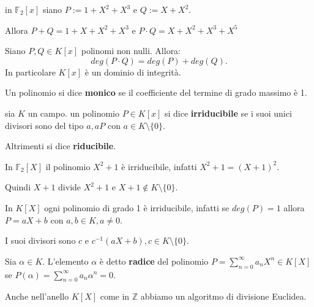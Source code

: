 \documentclass[../main.tex]{subfiles}
\begin{document}
\begin{example}
    in $\mathbb{F}_2[x]$ siano $P := 1 + X^2 + X^3$ e $Q:= X + X^2$.

    Allora $P+Q = 1 + X + X^2 + X^3$ e $P \cdot Q = X + X^2 + X^3 + X^5$
\end{example}

\begin{proposition}
    Siano $P,Q \in K[x]$ polinomi non nulli. Allora:
    \begin{equation*}
        deg(P \cdot Q) = deg(P) + deg(Q).
    \end{equation*}
    In particolare $K[x]$ è un dominio di integrità.
\end{proposition}

\begin{definition}
    Un polinomio si dice \textbf{monico} se il coefficiente del termine di grado massimo è 1.
\end{definition}

\begin{definition}
    sia $K$ un campo. un polinomio $P \in K[x]$ si dice \textbf{irriducibile} se i suoi unici divisori sono del tipo $a, aP$ con $a \in K \setminus \{0\}$.

    Altrimenti si dice \textbf{riducibile}.
\end{definition}

\begin{example}
    In $\mathbb{F}_2[X]$ il polinomio $X^2 + 1$ è irriducibile, infatti $X^2 + 1 = (X + 1)^2$.

    Quindi $X + 1$ divide $X^2 + 1$ e $X + 1 \notin K \setminus \{0\}$.
\end{example}

\begin{example}
    In $K[X]$ ogni polinomio di grado 1 è irriducibile, infatti se $deg(P) = 1$ allora $P = aX + b$ con $a,b \in K, a \neq 0$.

    I suoi divisori sono $c$ e $c^{-1} (aX + b), c \in K \setminus \{0\}$.
\end{example}

\begin{definition}
    Sia $\alpha \in K$. L'elemento $\alpha$ è detto \textbf{radice} del polinomio $P = \sum_{n=0}^{\infty} a_n X^n \in K[X]$ se $P(\alpha) = \sum_{n=0}^{\infty} a_n \alpha^n = 0$.
\end{definition}

Anche nell'anello $K[X]$ come in $\mathbb{Z}$ abbiamo un algoritmo di divisione Euclidea.
\end{document}
